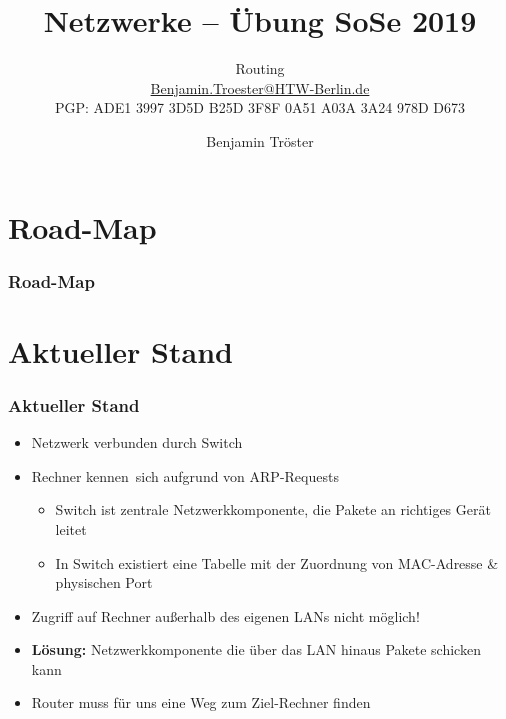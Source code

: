 \documentclass[xcolor=dvipsnames, aspectratio=169]{beamer}
\begin{document}

\title{Netzwerke -- Übung SoSe 2019}
\subtitle{Routing\\
		\href{mailto:Benjamin.Troester@HTW-Berlin.de}{Benjamin.Troester@HTW-Berlin.de}\\
		PGP: ADE1 3997 3D5D B25D 3F8F 0A51 A03A 3A24 978D D673 }
\author{Benjamin Tröster}

\date{}

\begin{frame}
\titlepage

\end{frame}

\section*{Road-Map}
\begin{frame}
\frametitle{Road-Map}
\begin{multicols}{2}
  \tableofcontents
\end{multicols}
\end{frame}

\section{Aktueller Stand}
\begin{frame}
	\frametitle{Aktueller Stand}
	\begin{itemize}
		\item Netzwerk verbunden durch Switch
		\item Rechner \glqq kennen\grqq\ sich aufgrund von ARP-Requests
		\begin{itemize}
			\item Switch ist zentrale Netzwerkkomponente, die Pakete an richtiges Gerät leitet
			\item In Switch existiert eine Tabelle mit der Zuordnung von MAC-Adresse \& physischen Port
		\end{itemize}
		\item Zugriff auf Rechner außerhalb des eigenen LANs nicht möglich!
		\item \textbf{Lösung:} Netzwerkkomponente die über das LAN hinaus Pakete schicken kann
		\item Router muss für uns eine Weg zum Ziel-Rechner finden
	\end{itemize}
\end{frame}
\end{document}
